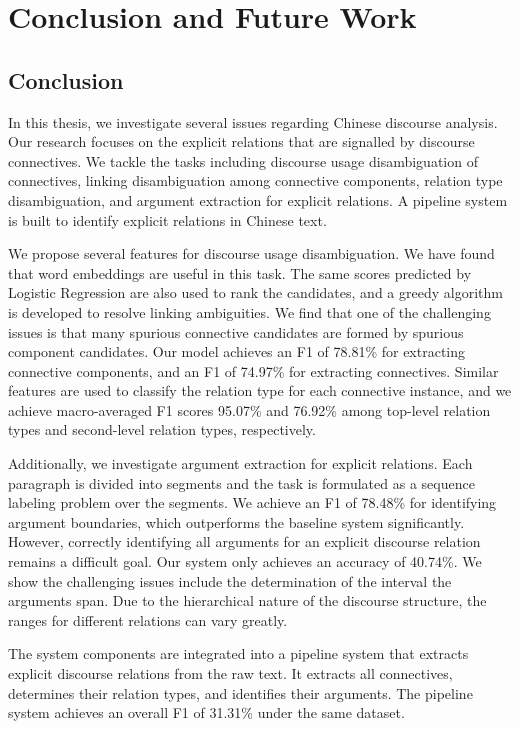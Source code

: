 %
%
%
\chapter{Conclusion and Future Work}
\label{c:future}

\section{Conclusion}

In this thesis, we investigate several issues
regarding Chinese discourse analysis. Our
research focuses on the explicit relations that
are signalled by discourse connectives.
We tackle the tasks including discourse
usage disambiguation of connectives,
linking disambiguation among connective components,
relation type disambiguation, and argument
extraction for explicit relations. A pipeline
system is built to identify explicit relations
in Chinese text.

We propose several features
for discourse usage disambiguation.
We have found that word embeddings are useful in this
task. The same scores predicted by Logistic Regression
are also used to rank the candidates, and 
a greedy algorithm is developed to resolve linking
ambiguities. We find that one of the challenging issues
is that many spurious connective candidates are formed by 
spurious component candidates. Our model achieves
an F1 of 78.81\% for extracting connective components,
and an F1 of 74.97\% for extracting connectives. Similar
features are used to classify the relation type for each
connective instance, and we achieve macro-averaged F1 scores
95.07\% and 76.92\% among top-level relation types and
second-level relation types, respectively.

Additionally, we investigate argument extraction for
explicit relations. Each paragraph is divided into segments
and the task is formulated as a sequence labeling problem
over the segments.
We achieve an F1 of 78.48\% for identifying
argument boundaries, which outperforms the baseline system
significantly. However, correctly identifying all arguments
for an explicit discourse relation remains a difficult goal. Our
system only achieves an accuracy of 40.74\%. We show
the challenging issues include the determination of
the interval the arguments span. Due to the hierarchical
nature of the discourse structure, the ranges for
different relations can vary greatly.

The system components are integrated into a pipeline
system that extracts explicit discourse relations from the raw text.
It extracts all connectives, determines their relation types,
and identifies their arguments.
The pipeline system achieves an overall F1 of 31.31\% under
the same dataset.

